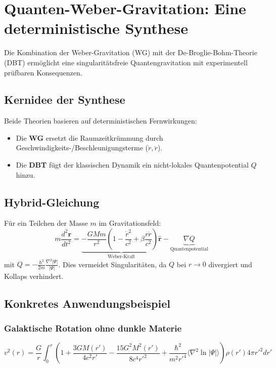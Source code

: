 \section{Quanten-Weber-Gravitation: Eine deterministische Synthese}
Die Kombination der Weber-Gravitation (WG) mit der De-Broglie-Bohm-Theorie (DBT) ermöglicht eine singularitätsfreie Quantengravitation mit experimentell prüfbaren Konsequenzen.

\subsection{Kernidee der Synthese}
Beide Theorien basieren auf deterministischen Fernwirkungen:
\begin{itemize}
    \item Die \textbf{WG} ersetzt die Raumzeitkrümmung durch Geschwindigkeits-/Beschleunigungsterme ($\dot{r}, \ddot{r}$).
    \item Die \textbf{DBT} fügt der klassischen Dynamik ein nicht-lokales Quantenpotential $Q$ hinzu.
\end{itemize}

\subsection{Hybrid-Gleichung}
Für ein Teilchen der Masse $m$ im Gravitationsfeld:
\begin{equation}
    m\frac{d^2\mathbf{r}}{dt^2} = \underbrace{-\frac{GMm}{r^2}\left(1-\frac{\dot{r}^2}{c^2}+\beta\frac{r\ddot{r}}{c^2}\right)\hat{\mathbf{r}}}_{\text{Weber-Kraft}} - \underbrace{\nabla Q}_{\text{Quantenpotential}}
\end{equation}
mit $Q = -\frac{\hbar^2}{2m}\frac{\nabla^2|\Psi|}{|\Psi|}$. Dies vermeidet Singularitäten, da $Q$ bei $r \to 0$ divergiert und Kollaps verhindert.

\subsection{Konkretes Anwendungsbeispiel}
\subsubsection{Galaktische Rotation ohne dunkle Materie}
\begin{equation}
    v^2(r) = \frac{G}{r} \int_0^r \left(1 + \frac{3G M(r')}{4c^2 r'} - \frac{15G^2 M^2(r')}{8c^4 r'^2} + \frac{\hbar^2}{m^2 r'^4} \langle \nabla^2 \ln|\Psi|\rangle \right) \rho(r') 4\pi r'^2 dr'
\end{equation}

